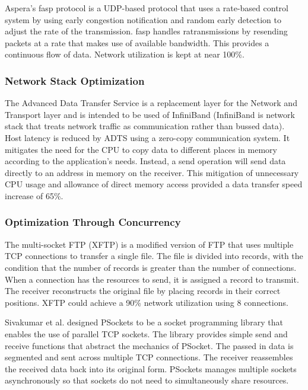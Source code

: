 Aspera's fasp protocol \cite{Aspera2016}\cite{Fan2010} is a UDP-based protocol that uses a rate-based control system by using early congestion notification and random early detection to adjust the rate of the transmission. fasp handles ratransmissions by resending packets at a rate that makes use of available bandwidth. This provides a continuous flow of data. Network utilization is kept at near 100\%.

\subsubsection{Network Stack Optimization}

The Advanced Data Transfer Service \cite{lai2009designing} is a replacement layer for the Network and Transport layer and is intended to be used of InfiniBand \cite{Pfister2001} (InfiniBand is network stack that treats network traffic as communication rather than bussed data). Host latency is reduced by ADTS using a zero-copy communication system. It mitigates the need for the CPU to copy data to different places in memory according to the application's needs. Instead, a send operation will send data directly to an address in memory on the receiver. This mitigation of unnecessary CPU usage and allowance of direct memory access provided a data transfer speed increase of 65\%.

\subsubsection{Optimization Through Concurrency}

The multi-socket FTP (XFTP) \cite{Allman1995}\cite{Allman1997} is a modified version of FTP \cite{postel1980user} that uses multiple TCP connections to transfer a single file. The file is divided into records, with the condition that the number of records is greater than the number of connections. When a connection has the resources to send, it is assigned a record to transmit. The receiver reconstructs the original file by placing records in their correct positions. XFTP could achieve a 90\% network utilization using 8 connections.

Sivakumar et al. designed PSockets \cite{Sivakumar2000psockets} to be a socket programming library that enables the use of parallel TCP sockets. The library provides simple send and receive functions that abstract the mechanics of PSocket. The passed in data is segmented and sent across multiple TCP connections. The receiver reassembles the received data back into its original form. PSockets manages multiple sockets asynchronously so that sockets do not need to simultaneously share resources. 


